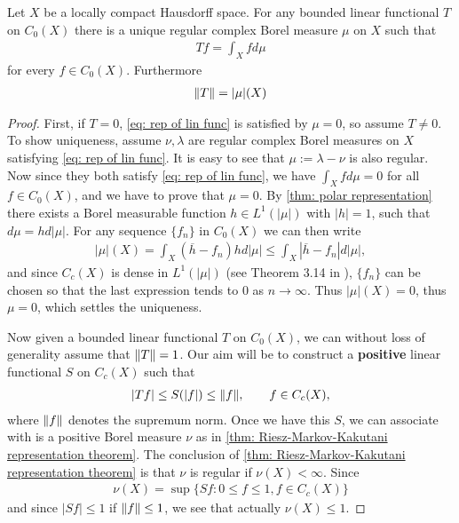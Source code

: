 \begin{theorem}\label{thm: Riesz-markov}
Let $X$ be a locally compact Hausdorff space. For any bounded linear functional $T$ on $C_{0}(X)$ there is a unique regular complex Borel measure $\mu$ on $X$ such that
\begin{align}
	Tf=\int_{X}fd\mu \label{eq: rep of lin func}
\end{align}
for every $f\in C_{0}(X)$. Furthermore
\begin{align}
	\Vert{T}\Vert=|\mu|(X) \label{eq: jadfhsadf}
\end{align}
\end{theorem}
\begin{proof}
First, if $T=0$, \eqref{eq: rep of lin func} is satisfied by $\mu=0$, so assume $T\neq 0$.
To show uniqueness, assume $\nu, \lambda$ are regular complex Borel measures on $X$ satisfying \eqref{eq: rep of lin func}. It is easy to see that $\mu:=\lambda-\nu$ is also regular. Now since they both satisfy \eqref{eq: rep of lin func}, we have $\int_{X}fd\mu=0$ for all $f\in C_{0}(X)$, and we have to prove that $\mu=0$. By \cref{thm: polar representation} there exists a Borel measurable function $h\in L^{1}(|\mu|)$ with $|h|=1$, such that $d\mu=hd|\mu|$. For any sequence $\{f_{n}\}$ in $C_{0}(X)$ we can then write
\begin{align*}
	|\mu|(X)=\int_{X}(\overline{h}-f_{n})hd|\mu|\le \int_{X}|\overline{h}-f_{n}|d|\mu|,
\end{align*}
and since $C_{c}(X)$ is dense in $L^{1}(|\mu|)$ (see Theorem 3.14 in \cite{Rudin87}), $\{f_{n}\}$ can be chosen so that the last expression tends to $0$ as $n\to \infty$. Thus $|\mu|(X)=0$, thus $\mu=0$, which settles the uniqueness.

Now given a bounded linear functional $T$ on $C_{0}(X)$, we can without loss of generality assume that $\Vert{T}\Vert=1$. Our aim will be to construct a \textbf{positive} linear functional $S$ on $C_{c}(X)$ such that
\begin{align}
	|Tf| \le S(|f|)\le \Vert{f}\Vert, \qquad f\in C_{c}(X), \label{eq: ineq of lin funcs}
\end{align}
where $\Vert{f}\Vert$ denotes the supremum norm. Once we have this $S$, we can associate with is a positive Borel measure $\nu$ as in \cref{thm: Riesz-Markov-Kakutani representation theorem}. The conclusion of \cref{thm: Riesz-Markov-Kakutani representation theorem} is that $\nu$ is regular if $\nu(X)<\infty$. Since
\begin{align*}
	\nu(X)=\sup\{ Sf: 0 \le f \le 1,  f\in C_{c}(X) \}
\end{align*}
and since $|Sf| \le 1$ if $\Vert{f}\Vert \le 1$, we see that actually $\nu(X)\le 1$.


\end{proof}
